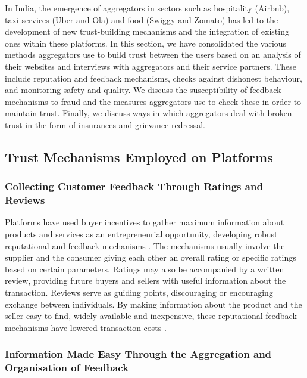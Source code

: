 \documentclass[a4paper, 12pt]{article}
\begin{document}
                    In India, the emergence of aggregators in sectors such as hospitality (Airbnb), taxi services (Uber and Ola) and food (Swiggy and Zomato) has led to the development of new trust-building mechanisms and the integration of existing ones within these platforms. In this section, we have consolidated the various methods aggregators use to build trust between the users based on an analysis of their websites and interviews with aggregators and their service partners. These include reputation and feedback mechanisms, checks against dishonest behaviour, and monitoring safety and quality. We discuss the susceptibility of feedback mechanisms to fraud and the measures aggregators use to check these in order to maintain trust. Finally, we discuss ways in which aggregators deal with broken trust in the form of insurances and grievance redressal.\\
                    
                    \subsection{Trust Mechanisms Employed on Platforms }
\subsubsection{Collecting Customer Feedback Through Ratings and Reviews}
                    
          Platforms have used buyer incentives to gather maximum information about products and services as an entrepreneurial opportunity, developing robust reputational and feedback mechanisms \parencite{thierer2015internet}. The mechanisms usually involve the supplier and the consumer giving each other an overall rating or specific ratings based on certain parameters. Ratings may also be accompanied by a written review, providing future buyers and sellers with useful information about the transaction. Reviews serve as guiding points, discouraging or encouraging exchange between individuals. By making information about the product and the seller easy to find, widely available and inexpensive, these reputational feedback mechanisms have lowered transaction costs \parencite{EYreport}.\\

\subsubsection{Information Made Easy Through the Aggregation and Organisation of Feedback}
                    
\end{document}
